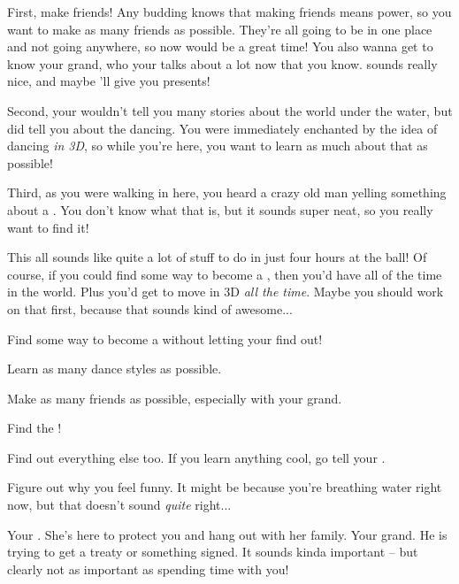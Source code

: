 \documentclass[char]{NeptuneBall}
\begin{document}
First, make friends! Any budding \cWillow{\prince} knows that making friends means power, so you want to make as many friends as possible. They're all going to be in one place and not going anywhere, so now would be a great time! You also wanna get to know your grand\cKing{\pa}, who your \cAriel{\pa} talks about a lot now that you know. \cKing{\They} sounds really nice, and maybe \cKing{\they}'ll give you presents!

Second, your \cAriel{\pa} wouldn't tell you many stories about the world under the water, but \cAriel{\they} did tell you about the dancing. You were immediately enchanted by the idea of dancing \emph{in 3D}, so while you're here, you want to learn as much about that as possible!

Third, as you were walking in here, you heard a crazy old man yelling something about a \iWishingStone{\MYname}. You don't know what that is, but it sounds super neat, so you really want to find it!

This all sounds like quite a lot of stuff to do in just four hours at the ball! Of course, if you could find some way to become a \cWillow{\mer}, then you'd have all of the time in the world. Plus you'd get to move in 3D \emph{all the time}. Maybe you should work on that first, because that sounds kind of awesome...

\begin{itemz}[Goals]
  \item Find some way to become a \cWillow{\mer} without letting your \cAriel{\parent} find out!
  \item Learn as many dance styles as possible.
  \item Make as many friends as possible, especially with your grand\cKing{\pa}.
	\item Find the \iWishingStone{}!
  \item Find out everything else too. If you learn anything cool, go tell your \cAriel{\parent}.
	\item Figure out why you feel funny. It might be because you're breathing water right now, but that doesn't sound \emph{quite} right...
\end{itemz}

\begin{contacts}
  \contact{\cAriel{}} Your \cAriel{\parent}. She's here to protect you and hang out with her family.
	\contact{\cKing{}} Your grand\cKing{\parent}. He is trying to get a treaty or something signed. It sounds kinda important -- but clearly not as important as spending time with you!
\end{contacts}
\end{document}
